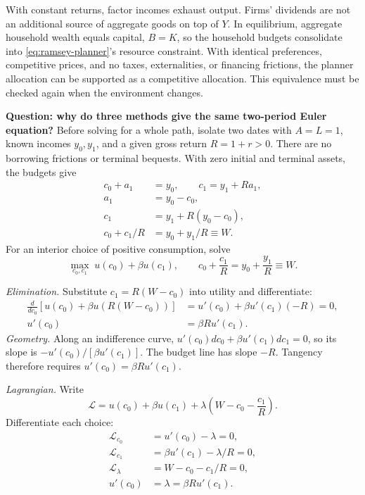 With constant returns, factor incomes exhaust output. Firms' dividends are
not an additional source of aggregate goods on top of $Y$. In equilibrium,
aggregate household wealth equals capital, $B=K$, so the household budgets
consolidate into \eqref{eq:ramsey-planner}'s resource constraint. With identical
preferences, competitive prices, and no taxes, externalities, or financing
frictions, the planner allocation can be supported as a competitive allocation.
This equivalence must be checked again when the environment changes.

\begin{redblock}
\textbf{Question: why do three methods give the same two-period Euler equation?}
Before solving for a whole path, isolate two dates with $A=L=1$, known incomes
$y_0,y_1$, and a given gross return $R=1+r>0$. There are no borrowing frictions
or terminal bequests. With zero initial and terminal assets, the budgets give
\begin{align*}
c_0+a_1&=y_0,\qquad c_1=y_1+Ra_1,\\
a_1&=y_0-c_0,\\
c_1&=y_1+R(y_0-c_0),\\
c_0+c_1/R&=y_0+y_1/R\equiv W.
\end{align*}
For an interior choice of positive consumption, solve
\[
\max_{c_0,c_1}\;u(c_0)+\beta u(c_1),\qquad
c_0+\frac{c_1}{R}=y_0+\frac{y_1}{R}\equiv W.
\]
\end{redblock}

\textit{Elimination.} Substitute $c_1=R(W-c_0)$ into utility and differentiate:
\begin{align*}
\frac{d}{dc_0}[u(c_0)+\beta u(R(W-c_0))]
 &=u'(c_0)+\beta u'(c_1)(-R)=0,\\
u'(c_0)&=\beta R u'(c_1).
\end{align*}
\textit{Geometry.} Along an indifference curve,
$u'(c_0)dc_0+\beta u'(c_1)dc_1=0$, so its slope is
$-u'(c_0)/[\beta u'(c_1)]$. The budget line has slope $-R$. Tangency therefore
requires $u'(c_0)=\beta R u'(c_1)$.

\textit{Lagrangian.} Write
\[
\mathscr L=u(c_0)+\beta u(c_1)
 +\lambda\left(W-c_0-\frac{c_1}{R}\right).
\]
Differentiate each choice:
\begin{align*}
\mathscr L_{c_0}&=u'(c_0)-\lambda=0,\\
\mathscr L_{c_1}&=\beta u'(c_1)-\lambda/R=0,\\
\mathscr L_\lambda&=W-c_0-c_1/R=0,\\
u'(c_0)&=\lambda=\beta R u'(c_1).
\end{align*}

